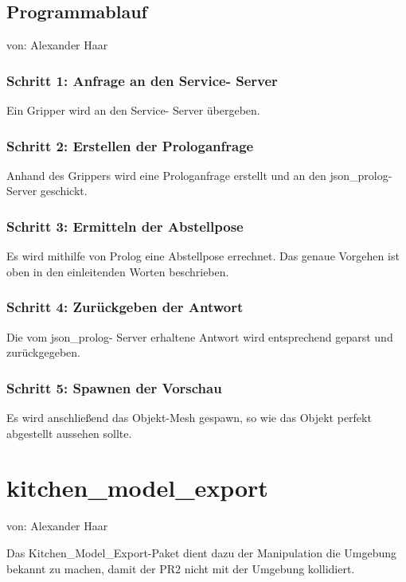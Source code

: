 \documentclass{suturo}
\makeatletter
\newcommand{\chapterauthor}[1]{%
  {\parindent0pt\vspace*{-27pt}%
  \linespread{0}\small\begin{flushright}von: #1\end{flushright}%
  \par\nobreak\vspace*{0pt}}
  \@afterheading%
}
\makeatother
\begin{document}
\subsection{Programmablauf}
\chapterauthor{Alexander Haar}
\subsubsection{Schritt 1: Anfrage an den Service- Server}
Ein Gripper wird an den Service- Server übergeben.
\subsubsection{Schritt 2: Erstellen der Prologanfrage}
Anhand des Grippers wird eine Prologanfrage erstellt und an den json\_prolog- Server geschickt.
\subsubsection{Schritt 3: Ermitteln der Abstellpose} 
Es wird mithilfe von Prolog eine Abstellpose errechnet. Das genaue Vorgehen ist oben in den einleitenden Worten beschrieben.
\subsubsection{Schritt 4: Zurückgeben der Antwort}
Die vom json\_prolog- Server erhaltene Antwort wird entsprechend geparst und zurückgegeben.
\subsubsection{Schritt 5: Spawnen der Vorschau} 
Es wird anschließend das Objekt-Mesh gespawn, so wie das Objekt perfekt abgestellt aussehen sollte.

\section{kitchen\_model\_export}
\chapterauthor{Alexander Haar}
Das Kitchen\_Model\_Export-Paket dient dazu der Manipulation die Umgebung bekannt zu machen, damit der PR2 nicht mit der Umgebung kollidiert.

\begin{figure}[!htb]
\end{figure}
      
\end{document}
